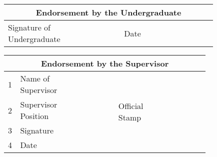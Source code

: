 \begin{center}
	\begin{tabular}{|m{0.29\linewidth}  |m{0.20\linewidth}  |m{0.05\linewidth}  |m{0.29\linewidth}  |}
		\hline 
		\multicolumn{4}{|c|}{\textbf{Endorsement by the Undergraduate}}\\ \hline
		Signature of Undergraduate && Date&\\[1mm]\hline		
	\end{tabular}
\end{center}

\begin{center}
	\begin{tabular}{|m{0.03\linewidth}  |m{0.21\linewidth}|  m{0.25\linewidth}|m{0.02\linewidth}|m{0.29\linewidth}|}
		\hline 
		\multicolumn{5}{|c|}{\textbf{Endorsement by the Supervisor}}\\ \hline
		1 & Name of Supervisor & & \multirow{4}{*}{\begin{sideways} Official Stamp \end{sideways}}& \multirow{4}{*}{}\\[1mm]
		 
	\cline{1-3}	2 & Supervisor Position & & & \\[1mm] 
	\cline{1-3}	3 & Signature & &&  \\[1mm] 
	\cline{1-3}		4 & Date & && \\[1mm] \hline
	\end{tabular}
\end{center}

\newpage \ \newpage